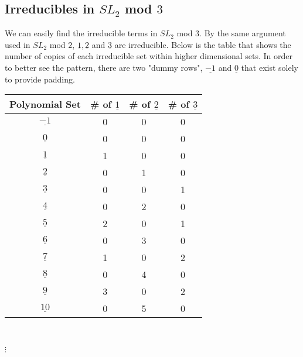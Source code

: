 \documentclass[a4paper,draft]{amsproc}
\theoremstyle{plain}
\theoremstyle{definition}
\theoremstyle{remark}
\numberwithin{equation}{section}
\begin{document}
\subsection{Irreducibles in $SL_{2}$ mod $3$}
We can easily find the irreducible terms in $SL_{2}$ mod $3$. By the same argument used in $SL_{2}$ mod $2$, $\underline{1}, \underline{2}$ and $\underline{3}$ are irreducible. Below is the table that shows the number of copies of each irreducible set within higher dimensional sets. In order to better see the pattern, there are two "dummy rows", $\underline{-1}$ and $\underline{0}$ that exist solely to provide padding. 
\begin{table}[h]
\begin{tabular}{|c|c|c|c|}
\hline
Polynomial Set & \# of $\underline{1}$ & \# of $\underline{2}$ & \# of $\underline{3}$ \\ \hline
$\underline{-1}$             & 0       & 0       & 0       \\ \hline
$\underline{0}$              & 0       & 0       & 0       \\ \hline
$\underline{1}$              & 1       & 0       & 0       \\ \hline
$\underline{2}$              & 0       & 1       & 0       \\ \hline
$\underline{3}$              & 0       & 0       & 1       \\ \hline
$\underline{4}$              & 0       & 2       & 0       \\ \hline
$\underline{5}$              & 2       & 0       & 1       \\ \hline
$\underline{6}$              & 0       & 3       & 0       \\ \hline
$\underline{7}$              & 1       & 0       & 2       \\ \hline
$\underline{8}$              & 0       & 4       & 0       \\ \hline
$\underline{9}$              & 3       & 0       & 2       \\ \hline
$\underline{10}$             & 0       & 5       & 0       \\ \hline
\end{tabular} \\
\begin{centering}$\vdots$\end{centering}
\end{table}
\end{document}
